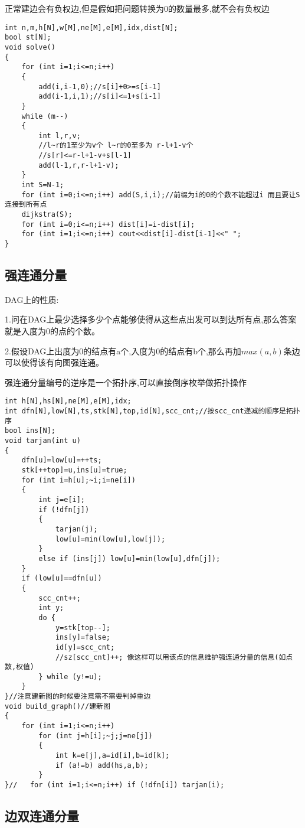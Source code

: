 \documentclass[a4paper]{ctexart}
\begin{document}
正常建边会有负权边,但是假如把问题转换为0的数量最多,就不会有负权边

\begin{lstlisting}
int n,m,h[N],w[M],ne[M],e[M],idx,dist[N];
bool st[N];
void solve()
{
    for (int i=1;i<=n;i++)
    {
        add(i,i-1,0);//s[i]+0>=s[i-1]
        add(i-1,i,1);//s[i]<=1+s[i-1]
    }
    while (m--)
    {
        int l,r,v;
        //l~r的1至少为v个 l~r的0至多为 r-l+1-v个
        //s[r]<=r-l+1-v+s[l-1]
        add(l-1,r,r-l+1-v);
    }
    int S=N-1;
    for (int i=0;i<=n;i++) add(S,i,i);//前缀为i的0的个数不能超过i 而且要让S连接到所有点
    dijkstra(S);
    for (int i=0;i<=n;i++) dist[i]=i-dist[i];
    for (int i=1;i<=n;i++) cout<<dist[i]-dist[i-1]<<" ";
}
\end{lstlisting}

\subsection{强连通分量}

DAG上的性质:

1.问在DAG上最少选择多少个点能够使得从这些点出发可以到达所有点,那么答案就是入度为0的点的个数。

2.假设DAG上出度为0的结点有a个,入度为0的结点有b个,那么再加$max(a,b)$条边可以使得该有向图强连通。

强连通分量编号的逆序是一个拓扑序,可以直接倒序枚举做拓扑操作

\begin{lstlisting}
int h[N],hs[N],ne[M],e[M],idx;
int dfn[N],low[N],ts,stk[N],top,id[N],scc_cnt;//按scc_cnt递减的顺序是拓扑序
bool ins[N];
void tarjan(int u)
{
	dfn[u]=low[u]=++ts;
	stk[++top]=u,ins[u]=true;
	for (int i=h[u];~i;i=ne[i])
	{
		int j=e[i];
		if (!dfn[j])
		{
			tarjan(j);
			low[u]=min(low[u],low[j]);
		}
		else if (ins[j]) low[u]=min(low[u],dfn[j]);
	}
	if (low[u]==dfn[u])
	{
		scc_cnt++;
		int y;
		do {
			y=stk[top--];
			ins[y]=false;
			id[y]=scc_cnt;
            //sz[scc_cnt]++; 像这样可以用该点的信息维护强连通分量的信息(如点数,权值)
		} while (y!=u);
	}
}//注意建新图的时候要注意需不需要判掉重边
void build_graph()//建新图
{
    for (int i=1;i<=n;i++)
        for (int j=h[i];~j;j=ne[j])
        {
            int k=e[j],a=id[i],b=id[k];
            if (a!=b) add(hs,a,b);
        }
}//   for (int i=1;i<=n;i++) if (!dfn[i]) tarjan(i);
\end{lstlisting}


\subsection{边双连通分量}
\end{document}
